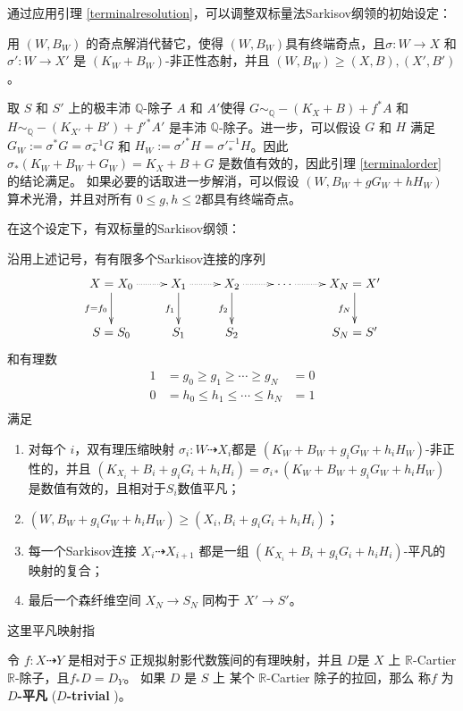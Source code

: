 通过应用引理 \ref{terminalresolution}，可以调整双标量法Sarkisov纲领的初始设定：
\begin{assertion}\label{doublesetting}
用 $(W,B_W)$ 的奇点解消代替它，使得 $(W,B_{W})$具有终端奇点，且$\sigma:W\to X$ 和$\sigma':W\to X'$ 是 $(K_W+B_W)$-非正性态射，并且 $(W,B_W)\geqslant (X,B),(X',B')$。

  取 $ S $ 和 $ S' $ 上的极丰沛 $\mathbb{Q}$-除子 $ A $ 和 $ A' $使得 $ G\sim_{\mathbb{Q}}-(K_X+B)+f^*A $ 和 $ H\sim_{\mathbb{Q}}-(K_{X'}+B')+f'^{*}A' $ 是丰沛 $\mathbb{Q}$-除子。进一步，可以假设 $ G $ 和 $ H $ 满足 $G_{W}:= \sigma^*G=\sigma^{-1}_*G $ 和 $ H_{W}:=\sigma'^{*}H=\sigma'^{-1}_*H $。因此 $\sigma_{*}(K_{W}+B_{W}+G_{W})=K_{X}+B+G$ 是数值有效的，因此引理 \ref{terminalorder} 的结论满足。
如果必要的话取进一步解消，可以假设
 $(W, B_W+gG_W+hH_W)$ 算术光滑，并且对所有 $0\leqslant g,h\leqslant 2$都具有终端奇点。
\end{assertion}
 在这个设定下，有双标量的Sarkisov纲领：
\begin{theorem}[双标量Sarkisov纲领]\label{main2}
  \cite[Claim 13.12]{haconMinimalModelProgram2012}
  沿用上述记号，有有限多个Sarkisov连接的序列
  \[
    \xymatrix{
    X=X_0\ar@{.>}[r]\ar[d]_{f=f_{0}}&X_{1}\ar@{.>}[r]\ar[d]_{f_{1}}& X_{2}\ar[d]_{f_{2}}\ar@{.>}[r] &\cdots\ar@{.>}[r]&X_N=X'\ar[d]_{f_{N}} \\
    S=S_{0}&S_{1} &S_{2}&&S_N=S'
    }
  \]
  和有理数
  \[
    \begin{aligned}
      1 & =g_0\geqslant g_1 \geqslant \cdots \geqslant g_N   & =0 \\
      0 & =h_0\leqslant h_{1} \leqslant \cdots \leqslant h_N & =1 \\
    \end{aligned}
  \]
  满足
  \begin{enumerate}
    \item 对每个 $i$，双有理压缩映射 $\sigma_i:W\dashrightarrow  X_{i}$都是 $(K_{W}+B_{W}+g_{i}G_{W}+h_{i}H_{W})$-非正性的，并且 $(K_{X_{i}}+B_{i}+g_{i}G_{i}+h_{i}H_{i})=\sigma_{i*}(K_{W}+B_{W}+g_{i}G_{W}+h_{i}H_{W})$ 是数值有效的，且相对于$S_{i}$数值平凡；
    \item $(W,B_{W}+g_{i}G_{W}+h_{i}H_{W})\geqslant (X_{i},B_{i}+g_{i}G_{i}+h_{i}H_{i})$；
    \item 每一个Sarkisov连接 $X_{i}\dashrightarrow X_{i+1}$ 都是一组 $(K_{X_{i}}+B_{i}+g_{i}G_{i}+h_{i}H_{i})$-平凡的映射的复合；
    \item 最后一个森纤维空间 $X_{N} \to S_{N}$ 同构于 $X'\to S'$。
  \end{enumerate}
\end{theorem}
这里平凡映射指
\begin{definition}\label{trivialmap}
  \cite[\S 13.2]{haconMinimalModelProgram2012} 令 $f:X\dashrightarrow Y$ 是相对于$S$ 正规拟射影代数簇间的有理映射，并且 $D$是 $X$  上  $\mathbb{R}$-Cartier $\mathbb{R}$-除子，且$f_*D=D_Y$。   如果 $D$ 是 $S$ 上 某个  $\mathbb{R}$-Cartier 除子的拉回，那么 称$f$ 为 \textbf{$D$-平凡} (\textbf{$D$-trivial })。
\end{definition}


